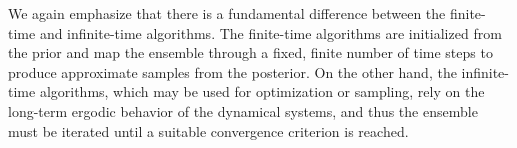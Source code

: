 \documentclass[12pt]{article}
\begin{document}
We again emphasize that there is a fundamental difference between the finite-time and infinite-time algorithms. The finite-time algorithms are initialized from the prior 
and map the ensemble through a fixed, finite number of time steps to produce approximate samples from the posterior. On the other hand, the infinite-time algorithms, 
which may be used for optimization or sampling, rely on the long-term ergodic behavior of the dynamical systems, and thus the ensemble must be iterated until 
a suitable convergence criterion is reached. 
\end{document}
